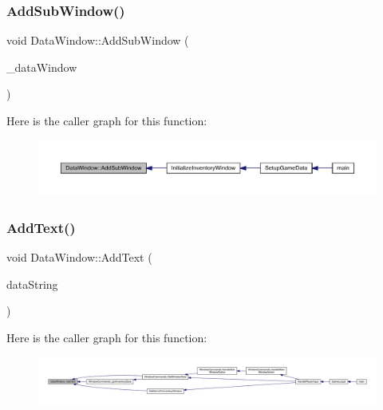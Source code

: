 \subsubsection{\texorpdfstring{Add\+Sub\+Window()}{AddSubWindow()}}
{\footnotesize\ttfamily void Data\+Window\+::\+Add\+Sub\+Window (\begin{DoxyParamCaption}\item[{\mbox{\hyperlink{class_data_window}{Data\+Window}}}]{\+\_\+data\+Window }\end{DoxyParamCaption})}

Here is the caller graph for this function\+:
\nopagebreak
\begin{figure}[H]
\begin{center}
\leavevmode
\includegraphics[width=350pt]{class_data_window_a0e57ffff01c3dad8282f9768a3c9e949_icgraph}
\end{center}
\end{figure}
\mbox{\label{class_data_window_a8bec28c4e6514e9b62b10686e0e9b40d}} 
\subsubsection{\texorpdfstring{Add\+Text()}{AddText()}}
{\footnotesize\ttfamily void Data\+Window\+::\+Add\+Text (\begin{DoxyParamCaption}\item[{std\+::string const \&}]{data\+String }\end{DoxyParamCaption})}

Here is the caller graph for this function\+:
\nopagebreak
\begin{figure}[H]
\begin{center}
\leavevmode
\includegraphics[width=350pt]{class_data_window_a8bec28c4e6514e9b62b10686e0e9b40d_icgraph}
\end{center}
\end{figure}
\mbox{\label{class_data_window_ab86de68d9766781ee295c69dbee5a985}} 
